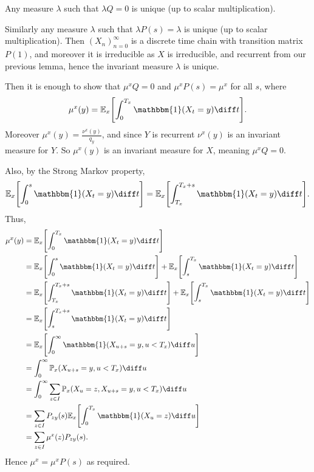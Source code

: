\documentclass[12pt]{article}
\begin{document}
\begin{proofbox}
	Any measure $\lambda$ such that $\lambda Q = 0$ is unique (up to scalar multiplication).

	Similarly any measure $\lambda$ such that $\lambda P(s) = \lambda$ is unique (up to scalar multiplication). Then $(X_n)_{n = 0}^{\infty}$ is a discrete time chain with transition matrix $P(1)$, and moreover it is irreducible as $X$ is irreducible, and recurrent from our previous lemma, hence the invariant measure $\lambda$ is unique.

	Then it is enough to show that $\mu^{x} Q = 0$ and $\mu^{x} P(s) = \mu^{x}$ for all $s$, where
	\[
		\mu^{x}(y) = \mathbb{E}_x \Biggl[ \int_{0}^{T_x} \mathbbm{1}(X_t = y) \diff t \Biggr]
	.\]
	Moreover $\mu^{x}(y) = \frac{\nu^{x}(y)}{q_y}$, and since $Y$ is recurrent $\nu^{x}(y)$ is an invariant measure for $Y$. So $\mu^{x}(y)$ is an invariant measure for $X$, meaning $\mu^{x}Q = 0$.

	Also, by the Strong Markov property,
	\[
		\mathbb{E}_x \Biggl[ \int_{0}^{s} \mathbbm{1}(X_t = y) \diff t \Biggr] = \mathbb{E}_x \Biggl[ \int_{T_x}^{T_x + s} \mathbbm{1}(X_t = y) \diff t \Biggr]
	.\]
	Thus,
	\begin{align*}
		\mu^{x}(y) &= \mathbb{E}_x \Biggl[ \int_{0}^{T_x} \mathbbm{1}(X_t = y) \diff t \Biggr] \\
			   &= \mathbb{E}_x \Biggl[ \int_{0}^{s} \mathbbm{1}(X_t = y) \diff t \Biggr] + \mathbb{E}_x \Biggl[ \int_{s}^{T_x} \mathbbm{1}(X_t = y) \diff t \Biggr] \\
			   &= \mathbb{E}_x \Biggl[ \int_{T_x}^{T_x + s} \mathbbm{1}(X_t = y) \diff t \Biggr] + \mathbb{E}_x \Biggl[ \int_{s}^{T_x} \mathbbm{1}(X_t = y) \diff t \Biggr] \\
			   &= \mathbb{E}_x \Biggl[ \int_{s}^{T_x + s} \mathbbm{1}(X_t = y) \diff t \Biggr] \\
			   &= \mathbb{E}_x \Biggl[ \int_{0}^{\infty} \mathbbm{1}(X_{u+s} = y, u < T_x) \diff u \Biggr] \\
			   &= \int_{0}^{\infty} \mathbb{P}_x(X_{u+s} = y, u < T_x) \diff u \\
			   &= \int_{0}^{\infty} \sum_{z \in I} \mathbb{P}_x (X_u = z, X_{u+s} = y, u < T_x) \diff u \\
			   &= \sum_{z \in I} P_{zy}(s) \mathbb{E}_x \Biggl[ \int_{0}^{T_x} \mathbbm{1}(X_u = z) \diff u \Biggr] \\
			   &= \sum_{z \in I} \mu^{x}(z) P_{zy}(s).
	\end{align*}
	Hence $\mu^{x} = \mu^{x} P(s)$ as required.
\end{proofbox}
\end{document}
